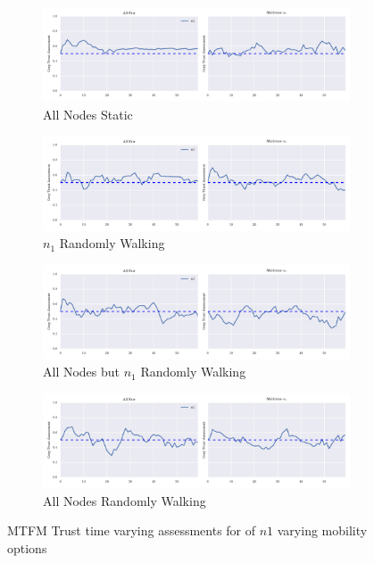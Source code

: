 \documentclass[runningheads,a4paper]{llncs}
\begin{document}
{{\begin{figure}
\begin{subfigure}{\textwidth}
  \centering
  \includegraphics[width=.8\linewidth]{img/grey_trust_bella_static_joint.pdf}
  \caption{All Nodes Static}
  \label{fig:grey_trust_static}
\end{subfigure}
\begin{subfigure}{\textwidth}
  \centering
  \includegraphics[width=.8\linewidth]{img/grey_trust_bella_single_mobile_joint.pdf}
  \caption{$n_1$ Randomly Walking}
  \label{fig:grey_trust_single}
\end{subfigure}
\begin{subfigure}{\textwidth}
\centering
  \includegraphics[width=.8\linewidth]{img/grey_trust_bella_allbut1_mobile_joint.pdf}
  \caption{All Nodes but $n_1$ Randomly Walking}
  \label{fig:grey_trust_allbut1}
\end{subfigure}
\begin{subfigure}{\textwidth}
\centering
  \includegraphics[width=.8\linewidth]{img/grey_trust_bella_all_mobile_joint.pdf}
  \caption{All Nodes Randomly Walking}
  \label{fig:grey_trust_all_mobile}
\end{subfigure}
\caption{MTFM Trust time varying assessments for of $n1$ varying mobility options}
\label{fig:trust_mobility}
\end{figure}

}}
\end{document}
